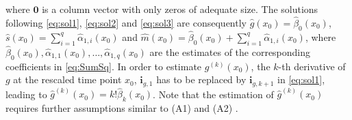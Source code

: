 where \(\mathbf{0}\) is a column vector with only zeros of adequate size. The solutions following \eqref{eq:sol1}, \eqref{eq:sol2} and \eqref{eq:sol3} are consequently \(\hat g(x_0) = \hat\beta_0(x_0)\), \(\hat s(x_0)=\sum_{i=1}^{q}\hat \alpha_{1,i}(x_0)\) and \(\hat m(x_0)=\hat\beta_0(x_0) + \sum_{i=1}^{q}\hat \alpha_{1,i}(x_0)\), where \(\hat\beta_0(x_0),\hat \alpha_{1,1}(x_0),\dots,\hat \alpha_{1,q}(x_0)\) are the estimates of the corresponding coefficients in \eqref{eq:SumSq}. In order to estimate \(g^{(k)}(x_0)\), the \(k\)-th derivative of \(g\) at the rescaled time point \(x_0\),
\(\mathbf{i}_{g,1}\) has to be replaced by \(\mathbf{i}_{g,k+1}\) in \eqref{eq:sol1}, leading to \(\hat g^{(k)}(x_0)=k!\hat \beta_{k}(x_0)\). Note that the estimation of \(\hat g^{(k)}(x_0)\) requires further assumptions similar to (A1) and (A2) \citep[see (\(\text{A1}^{'}\)) and (\(\text{A2}^{'}\)) in][]{feng2013seasonal}.

